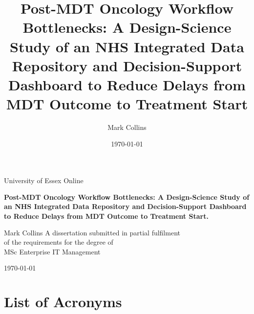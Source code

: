 \documentclass[12pt, a4paper, twoside]{report}
\title{Post-MDT Oncology Workflow Bottlenecks: A Design-Science Study of an NHS Integrated Data Repository and Decision-Support Dashboard to Reduce Delays from MDT Outcome to Treatment Start}
\author{Mark Collins}
\date{\today}
\begin{document}
\begin{titlepage}
    \centering
    {\Large University of Essex Online\par}
    \vspace{1.5cm}
    {\Huge\bfseries Post-MDT Oncology Workflow Bottlenecks: A Design-Science Study of an NHS Integrated Data Repository and Decision-Support Dashboard to Reduce Delays from MDT Outcome to Treatment Start.\par}
    \vspace{2cm}
    {\Large Mark Collins}
    \vfill
    A dissertation submitted in partial fulfilment\\
    of the requirements for the degree of\\
    MSc Enterprise IT Management\\
    \vspace{1cm}
    {\large \today\par}
\end{titlepage}

\setcounter{tocdepth}{1}
\tableofcontents







\chapter*{List of Acronyms}

\end{document}
